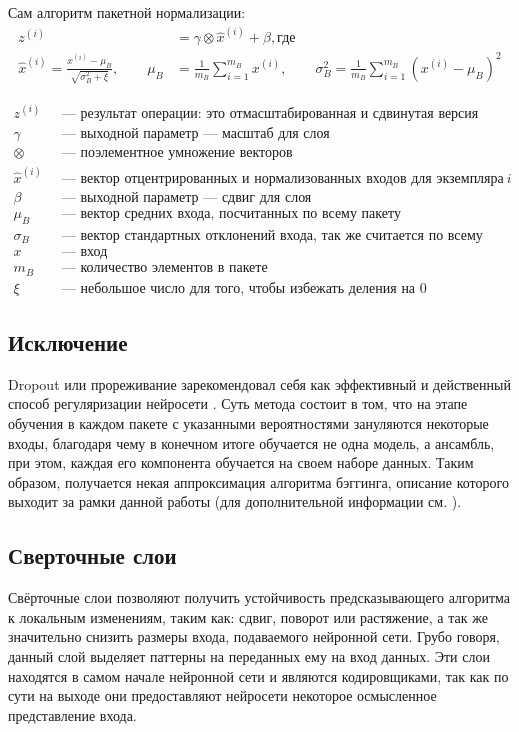 Сам алгоритм пакетной нормализации:
\begin{align*}
    z^{(i)} &= \gamma \otimes \hat x^{(i)} + \beta, \text{где} \\
    \hat x^{(i)} = \frac{x^{(i)} - \mu_B}{\sqrt{\sigma^2_B + \xi}}, \qquad
    \mu_B &= \frac{1}{m_B} \sum\limits_{i = 1}^{m_B}x^{(i)}, \qquad
    \sigma_B^2 = \frac{1}{m_B} \sum\limits_{i = 1}^{m_B}(x^{(i)} - \mu_B)^2
\end{align*}

\begin{align*}
    z^{(i)} & \: \text{ --- результат операции: это отмасштабированная и сдвинутая версия входов} \\
    \gamma & \: \text{ --- выходной параметр --- масштаб для слоя} \\
    \otimes & \: \text{ --- поэлементное умножение векторов} \\
    \hat x^{(i)} & \: \text{ --- вектор отцентрированных и нормализованных входов для экземпляра} \: i \\
    \beta & \: \text{ --- выходной параметр --- сдвиг для слоя} \\
    \mu_B & \: \text{ --- вектор средних входа, посчитанных по всему пакету} \\
    \sigma_B & \: \text{ --- вектор стандартных отклонений входа, так же считается по всему пакету} \\
    x & \: \text{ --- вход} \\
    m_B & \: \text{ --- количество элементов в пакете} \\
    \xi & \: \text{ --- небольшое число для того, чтобы избежать деления на 0}
\end{align*}

\subsection{Исключение}
Dropout или прореживание зарекомендовал себя как эффективный и действенный
способ регуляризации нейросети \cite{dropout-is-good}. Суть метода состоит в
том, что на этапе обучения в каждом пакете с указанными вероятностями
зануляются некоторые входы, благодаря чему в конечном итоге обучается не одна
модель, а ансамбль, при этом, каждая его компонента обучается на своем наборе
данных. Таким образом, получается некая аппроксимация алгоритма бэггинга,
описание которого выходит за рамки данной работы (для дополнительной информации
см. \cite{goodfellow}).

\subsection{Сверточные слои}
Свёрточные слои \cite{goodfellow} позволяют получить устойчивость
предсказывающего алгоритма к локальным изменениям, таким как: сдвиг, поворот
или растяжение, а так же значительно снизить размеры входа, подаваемого
нейронной сети. Грубо говоря, данный слой выделяет паттерны на переданных ему
на вход данных. Эти слои находятся в самом начале нейронной сети и являются
кодировщиками, так как по сути на выходе они предоставляют нейросети некоторое
осмысленное представление входа.


